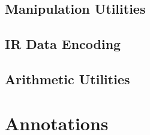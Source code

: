 \subsection{Manipulation Utilities}
\label{sec:Compiler.Core.Manipulation}
\subsection{IR Data Encoding}
\label{sec:Compiler.Core.Encoding}
\subsection{Arithmetic Utilities}
\label{sec:Compiler.Core.Arithmetic}



\section{Annotations}
\label{sec:Compiler.Core.Annotations}




